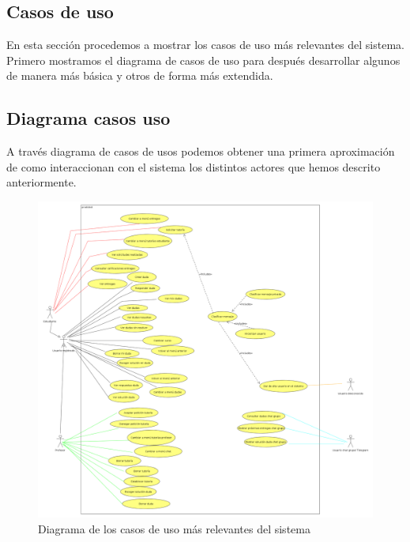 \newpage

\subsection{Casos de uso}

En esta sección procedemos a mostrar los casos de uso más relevantes del sistema. Primero mostramos el diagrama de casos de uso para después desarrollar algunos de manera más básica y otros de forma  más extendida.

\subsection{Diagrama casos uso}

A través diagrama de casos de usos podemos obtener una primera aproximación de como interaccionan con el sistema los distintos actores  que hemos descrito anteriormente. 
\begin{figure}[H] %
\centering
\includegraphics[scale=0.2]{imagenes/diagramas/diagrama_caso_uso.png}  %

\caption{Diagrama de los casos de uso más relevantes del sistema}\label{figura10}
\end{figure}

